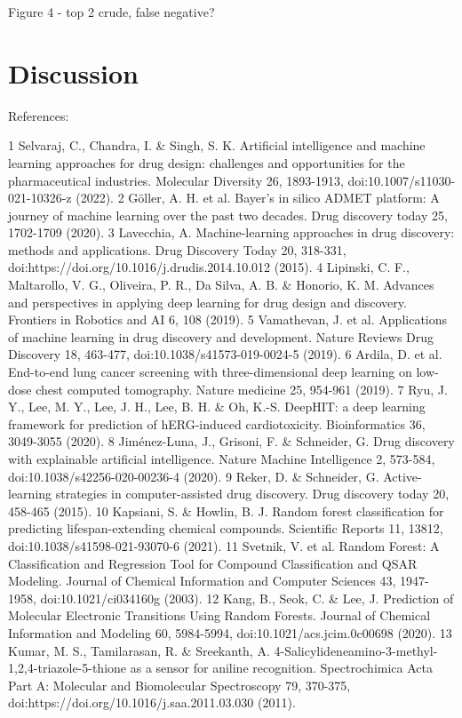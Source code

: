 Figure 4 - top 2 crude, false negative?

\section{Discussion}

References:

1	Selvaraj, C., Chandra, I. \& Singh, S. K. Artificial intelligence and machine learning approaches for drug design: challenges and opportunities for the pharmaceutical industries. Molecular Diversity 26, 1893-1913, doi:10.1007/s11030-021-10326-z (2022).
2	Göller, A. H. et al. Bayer’s in silico ADMET platform: A journey of machine learning over the past two decades. Drug discovery today 25, 1702-1709 (2020).
3	Lavecchia, A. Machine-learning approaches in drug discovery: methods and applications. Drug Discovery Today 20, 318-331, doi:https://doi.org/10.1016/j.drudis.2014.10.012 (2015).
4	Lipinski, C. F., Maltarollo, V. G., Oliveira, P. R., Da Silva, A. B. \& Honorio, K. M. Advances and perspectives in applying deep learning for drug design and discovery. Frontiers in Robotics and AI 6, 108 (2019).
5	Vamathevan, J. et al. Applications of machine learning in drug discovery and development. Nature Reviews Drug Discovery 18, 463-477, doi:10.1038/s41573-019-0024-5 (2019).
6	Ardila, D. et al. End-to-end lung cancer screening with three-dimensional deep learning on low-dose chest computed tomography. Nature medicine 25, 954-961 (2019).
7	Ryu, J. Y., Lee, M. Y., Lee, J. H., Lee, B. H. \& Oh, K.-S. DeepHIT: a deep learning framework for prediction of hERG-induced cardiotoxicity. Bioinformatics 36, 3049-3055 (2020).
8	Jiménez-Luna, J., Grisoni, F. \& Schneider, G. Drug discovery with explainable artificial intelligence. Nature Machine Intelligence 2, 573-584, doi:10.1038/s42256-020-00236-4 (2020).
9	Reker, D. \& Schneider, G. Active-learning strategies in computer-assisted drug discovery. Drug discovery today 20, 458-465 (2015).
10	Kapsiani, S. \& Howlin, B. J. Random forest classification for predicting lifespan-extending chemical compounds. Scientific Reports 11, 13812, doi:10.1038/s41598-021-93070-6 (2021).
11	Svetnik, V. et al. Random Forest: A Classification and Regression Tool for Compound Classification and QSAR Modeling. Journal of Chemical Information and Computer Sciences 43, 1947-1958, doi:10.1021/ci034160g (2003).
12	Kang, B., Seok, C. \& Lee, J. Prediction of Molecular Electronic Transitions Using Random Forests. Journal of Chemical Information and Modeling 60, 5984-5994, doi:10.1021/acs.jcim.0c00698 (2020).
13	Kumar, M. S., Tamilarasan, R. \& Sreekanth, A. 4-Salicylideneamino-3-methyl-1,2,4-triazole-5-thione as a sensor for aniline recognition. Spectrochimica Acta Part A: Molecular and Biomolecular Spectroscopy 79, 370-375, doi:https://doi.org/10.1016/j.saa.2011.03.030 (2011).

